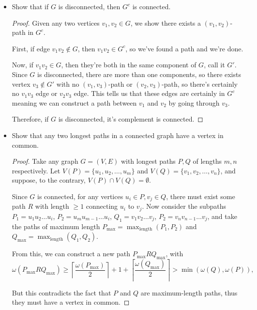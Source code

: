 \documentclass[11pt]{article}
\newcommand\itm[1]{\item[\textbf{#1}]}
\def\lc{\left\lceil}
\def\rc{\right\rceil}
\begin{document}
\begin{itemize}
  \itm{1.6.7} Show that if \(G\) is disconnected, then \(G^c\) is connected.
    \begin{proof}
      Given any two vertices \(v_1,v_2 \in G\), we show there exists a \((v_1,v_2)\)-path in \(G^c\).

      First, if edge \(v_1v_2 \not\in G\), then \(v_1v_2 \in G^c\), so we've found a path and we're done.

      Now, if \(v_1v_2 \in G\), then they're both in the same component of \(G\), call it \(G'\).  Since \(G\) is disconnected, there are more than one components, so there exists vertex \(v_3 \not\in G'\) with no \((v_1,v_3)\)-path or \((v_2,v_3)\)-path, so there's certainly no \(v_1v_3\) edge or \(v_2v_3\) edge.  This tells us that these edges are certainly in \(G^c\) meaning we can construct a path between \(v_1\) and \(v_2\) by going through \(v_3\).

      Therefore, if \(G\) is disconnected, it's complement is connected.
    \end{proof}
  


  \itm{1.6.10} Show that any two longest paths in a connected graph have a vertex in common.
    \begin{proof}
      Take any graph \(G=(V,E)\) with longest paths \(P,Q\) of lengths \(m,n\) respectively.  Let \(V(P) = \{u_1,u_2,\hdots,u_m\}\) and \(V(Q) = \{v_1,v_2,\hdots,v_n\}\), and suppose, to the contrary, \(V(P) \cap V(Q) = \emptyset\).

      Since \(G\) is connected, for any vertices \(u_i \in P, v_j \in Q\), there must exist some path \(R\) with length \(\geq 1\) connecting \(u_i\) to \(v_j\).  Now consider the subpaths \(P_1 = u_1u_2 \hdots u_i\), \(P_2 = u_{m}u_{m-1} \hdots u_i\), \(Q_1 = v_1v_2 \hdots v_j\), \(P_2 = v_{n}v_{n-1} \hdots v_j\), and take the paths of maximum length \(P_{\text{max}} = \displaystyle\max_{\text{length}} (P_1, P_2)\) and \(Q_{\text{max}} = \displaystyle\max_{\text{length}} (Q_1, Q_2)\).

      From this, we can construct a new path \(P_{\text{max}}RQ_{\text{max}}\), with \[\omega(P_{\text{max}}RQ_{\text{max}}) \geq \lc\frac{\omega(P_{\text{max}})}{2}\rc + 1 + \lc\frac{\omega(Q_{\text{max}})}{2}\rc > \min\left( \omega(Q), \omega(P) \right),\]

      But this contradicts the fact that \(P\) and \(Q\) are maximum-length paths, thus they must have a vertex in common.
    \end{proof}




\end{itemize}
\end{document}
